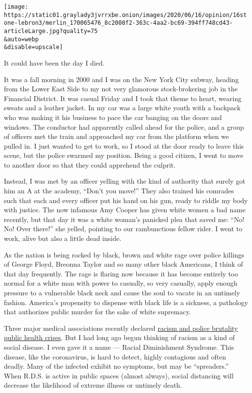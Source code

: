 \texttt{[image: https://static01.graylady3jvrrxbe.onion/images/2020/06/16/opinion/16stone-lebron3/merlin\_170065476\_8c2008f2-363c-4aa2-bc69-394ff748cd43-articleLarge.jpg?quality=75\\\&auto=webp\\\&disable=upscale]}

It could have been the day I died.

It was a fall morning in 2000 and I was on the New York City subway,
heading from the Lower East Side to my not very glamorous
stock-brokering job in the Financial District. It was casual Friday and
I took that theme to heart, wearing sweats and a leather jacket. In my
car was a large white youth with a backpack who was making it his
business to pace the car banging on the doors and windows. The conductor
had apparently called ahead for the police, and a group of officers met
the train and approached my car from the platform when we pulled in. I
just wanted to get to work, so I stood at the door ready to leave this
scene, but the police swarmed my position. Being a good citizen, I went
to move to another door so that they could apprehend the culprit.

Instead, I was met by an officer yelling with the kind of authority that
surely got him an A at the academy, ``Don't you move!'' They also
trained his comrades such that each and every officer put his hand on
his gun, ready to riddle my body with justice. The now infamous Amy
Cooper has given white women a bad name recently, but that day it was a
white woman's panicked plea that saved me: ``No! No! Over there!'' she
yelled, pointing to our rambunctious fellow rider. I went to work, alive
but also a little dead inside.

As the nation is being rocked by black, brown and white rage over police
killings of George Floyd, Breonna Taylor and so many other black
Americans, I think of that day frequently. The rage is flaring now
because it has become entirely too normal for a white man with power to
casually, so very casually, apply enough pressure to a vulnerable black
neck and cause the soul to vacate in an untimely fashion. America's
propensity to dispense with black life is a sickness, a pathology that
authorizes public murder for the sake of white supremacy.

Three major medical associations recently declared
\href{https://www.cnn.com/2020/06/01/health/racism-public-health-issue-police-brutality-wellness-bn/index.html}{racism
and police brutality public health crises}. But I had long ago begun
thinking of racism as a kind of social disease. I even gave it a name
--- Racial Diminishment Syndrome. This disease, like the coronavirus, is
hard to detect, highly contagious and often deadly. Many of the infected
exhibit no symptoms, but may be ``spreaders.'' When R.D.S. is active in
public spaces (almost always), social distancing will decrease the
likelihood of extreme illness or untimely death.

